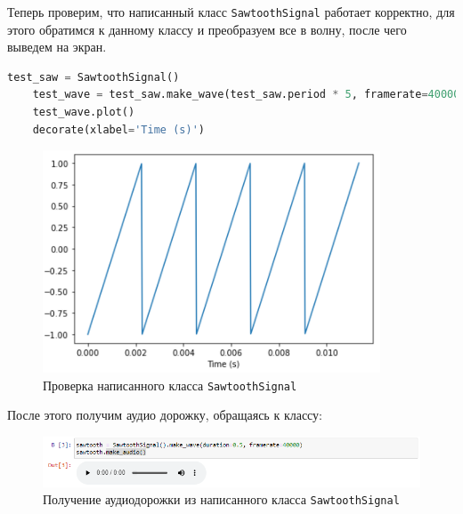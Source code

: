 \documentclass[a4paper]{article}
\begin{document}
            Теперь проверим, что написанный класс \texttt{SawtoothSignal} работает корректно, для этого обратимся к данному классу и преобразуем все в волну, после чего выведем на экран.

\begin{lstlisting}[language=Python, caption= Тестирование класса \texttt{SawtoothSignal}]
    test_saw = SawtoothSignal()
    test_wave = test_saw.make_wave(test_saw.period * 5, framerate=40000)
    test_wave.plot()
    decorate(xlabel='Time (s)')
\end{lstlisting}               
            
            \begin{figure}[H]
                \centering
                \includegraphics[width=\textwidth]{ex_2_test_class.png}
                \caption{Проверка написанного класса \texttt{SawtoothSignal}}
                \label{fig:test_class}
            \end{figure}
            
            После этого получим аудио дорожку, обращаясь к классу:
            
            \begin{figure}[H]
                \centering
                \includegraphics[width=\textwidth]{ex_2_class_audio.png}
                \caption{Получение аудиодорожки из написанного класса \texttt{SawtoothSignal}}
                \label{fig:class_audio}
            \end{figure}
            
\end{document}
